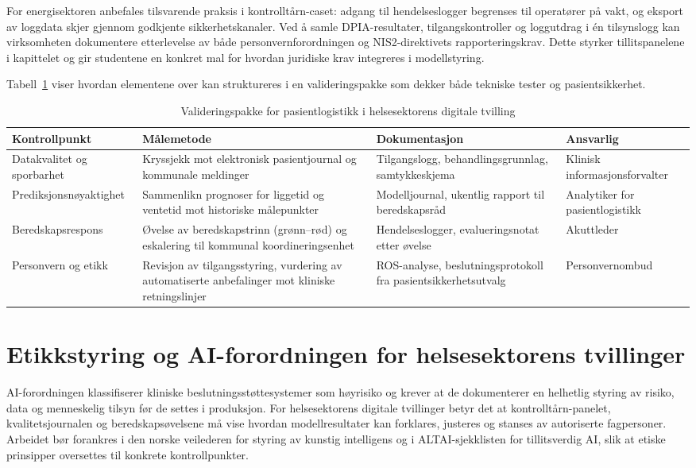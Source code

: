 For energisektoren anbefales tilsvarende praksis i kontrolltårn-caset: adgang til hendelseslogger begrenses til operatører på vakt, og eksport av loggdata skjer gjennom godkjente sikkerhetskanaler. Ved å samle DPIA-resultater, tilgangskontroller og loggutdrag i én tilsynslogg kan virksomheten dokumentere etterlevelse av både personvernforordningen og NIS2-direktivets rapporteringskrav. Dette styrker tillitspanelene i kapittelet og gir studentene en konkret mal for hvordan juridiske krav integreres i modellstyring.

Tabell~\ref{tab:helsevalidering} viser hvordan elementene over kan struktureres i en valideringspakke som dekker både tekniske tester og pasientsikkerhet.

\begin{table}[ht]
    \centering
    \caption{Valideringspakke for pasientlogistikk i helsesektorens digitale tvilling}
    \label{tab:helsevalidering}
    \begin{tabular}{|p{3.6cm}|p{4.2cm}|p{4.2cm}|p{3.0cm}|}
        \hline
        \textbf{Kontrollpunkt} & \textbf{Målemetode} & \textbf{Dokumentasjon} & \textbf{Ansvarlig} \\
        \hline
        Datakvalitet og sporbarhet & Kryssjekk mot elektronisk pasientjournal og kommunale meldinger & Tilgangslogg, behandlingsgrunnlag, samtykkeskjema & Klinisk informasjonsforvalter \\
        \hline
        Prediksjonsnøyaktighet & Sammenlikn prognoser for liggetid og ventetid mot historiske målepunkter & Modelljournal, ukentlig rapport til beredskapsråd & Analytiker for pasientlogistikk \\
        \hline
        Beredskapsrespons & Øvelse av beredskapstrinn (grønn–rød) og eskalering til kommunal koordineringsenhet & Hendelseslogger, evalueringsnotat etter øvelse & Akuttleder \\
        \hline
        Personvern og etikk & Revisjon av tilgangsstyring, vurdering av automatiserte anbefalinger mot kliniske retningslinjer & ROS-analyse, beslutningsprotokoll fra pasientsikkerhetsutvalg & Personvernombud \\
        \hline
    \end{tabular}
\end{table}

\section{Etikkstyring og AI-forordningen for helsesektorens tvillinger}
AI-forordningen klassifiserer kliniske beslutningsstøttesystemer som høyrisiko og krever at de dokumenterer en helhetlig styring av risiko, data og menneskelig tilsyn før de settes i produksjon.\citep{eu2024aiact} For helsesektorens digitale tvillinger betyr det at kontrolltårn-panelet, kvalitetsjournalen og beredskapsøvelsene må vise hvordan modellresultater kan forklares, justeres og stanses av autoriserte fagpersoner. Arbeidet bør forankres i den norske veilederen for styring av kunstig intelligens\citep{digdir2023styringai} og i ALTAI-sjekklisten for tillitsverdig AI, slik at etiske prinsipper oversettes til konkrete kontrollpunkter.\citep{ec2020trustworthyai}

